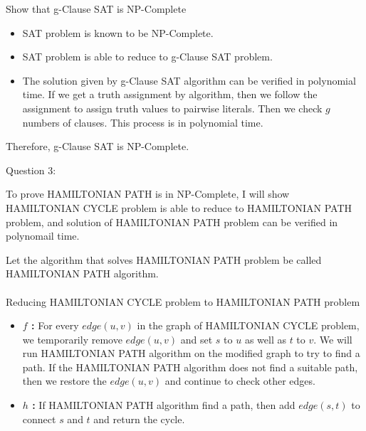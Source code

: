 \documentclass[12pt]{article}
\begin{document}
\noindent
Show that g-Clause SAT is NP-Complete
\begin{itemize}
  \item SAT problem is known to be NP-Complete.
  \item	SAT problem is able to reduce to g-Clause SAT problem.
  \item The solution given by g-Clause SAT algorithm can be verified in polynomial time. 
	If we get a truth assignment by algorithm, then we follow the assignment to assign truth values to pairwise literals. 
	Then we check $g$ numbers of clauses. This process is in polynomial time.
\end{itemize}
\noindent
Therefore, g-Clause SAT is NP-Complete.


\pagebreak
\noindent
\large Question 3: \vspace{5mm} \par
\normalsize
To prove HAMILTONIAN PATH is in NP-Complete, I will show HAMILTONIAN CYCLE problem is able to reduce to HAMILTONIAN PATH problem, 
and solution of HAMILTONIAN PATH problem can be verified in polynomail time. \par

Let the algorithm that solves HAMILTONIAN PATH problem be called HAMILTONIAN PATH algorithm.
\\
\\
\noindent
Reducing HAMILTONIAN CYCLE problem to HAMILTONIAN PATH problem
\begin{itemize}
  \item \textbf{$f$ :} For every $edge(u, v)$ in the graph of HAMILTONIAN CYCLE problem, we temporarily remove $edge(u, v)$ and set $s$ to $u$ as well as $t$ to $v$.
		       We will run HAMILTONIAN PATH algorithm on the modified graph to try to find a path.
		       If the HAMILTONIAN PATH algorithm does not find a suitable path, then we restore the $edge(u, v)$ and continue to check other edges. 
  \item	\textbf{$h$ :} If HAMILTONIAN PATH algorithm find a path, then add $edge(s, t)$ to connect $s$ and $t$ and return the cycle. 
\end{itemize}
\end{document}
